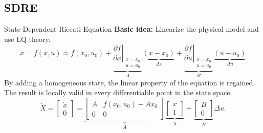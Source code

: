     \subsection{SDRE}
    \begin{frame}{State-Dependent Riccati Equation}
        \textbf{Basic idea: } Linearize the physical model and use LQ theory.
        \tiny
        \begin{equation*}
            \dot{x} = f(x,u) \approx f(x_{0},u_{0})
                + \underbrace{\left. \frac{\partial f}{\partial x} \right|_{
                    \begin{array}{l}
                        x=x_{0} \\
                        u=u_{0}
                    \end{array}
                }}_{A}
                    \underbrace{\left( x-x_{0} \right)}_{\Delta x}
                + \underbrace{\left. \frac{\partial f}{\partial u} \right|_{
                    \begin{array}{l}
                        x=x_{0} \\
                        u=u_{0}
                    \end{array}
                }}_{B}
                    \underbrace{\left( u-u_{0} \right)}_{\Delta u}
        \end{equation*}
        \normalsize
        By adding a homogeneous state, the linear property of the equation is regained.
        The result is locally valid in every differentiable point in the state space.
        \tiny
        \begin{equation*}
            \dot{X} = \left[
            \begin{array}{c}
                \dot{x} \\
                0
            \end{array}\right] =
            \underbrace{\left[
            \begin{array}{cc}
                A & f(x_{0},u_{0})-Ax_{0} \\
                0 & 0
            \end{array}\right]}_{\bar{A}}
            \underbrace{\left[
            \begin{array}{c}
                x \\
                1
            \end{array}\right]}_{\bar{X}}
            +
            \underbrace{\left[
            \begin{array}{c}
                B \\
                0
            \end{array}\right]}_{\bar{B}}
            \Delta u.
        \end{equation*}
    \end{frame}
